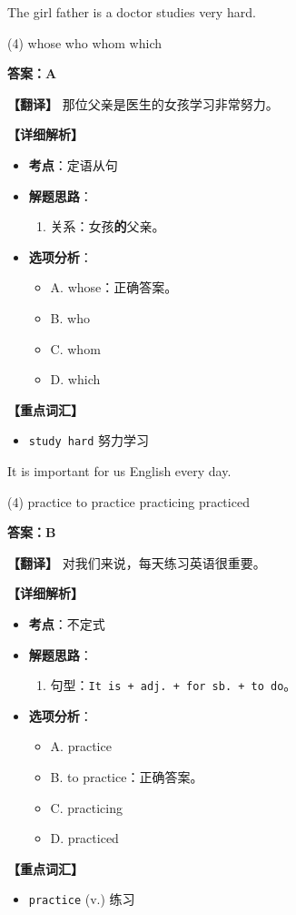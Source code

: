 \documentclass[11pt, a4paper]{article}
\newcommand{\analysis}[4]{
    \begin{solutionbox}
        \textbf{答案：#1}
        
        \textbf{【翻译】} #2
        
        \textbf{【详细解析】}
        #3
        
        \textbf{【重点词汇】}
        #4
    \end{solutionbox}
}
\newcommand{\blank}{\underline{\hspace{1.5cm}}}
\begin{document}
\begin{questions}
    \item The girl \blank father is a doctor studies very hard.
    \begin{tasks}(4)
        \task whose \task who \task whom \task which
    \end{tasks}
    \analysis{A}{那位父亲是医生的女孩学习非常努力。}{
        \begin{itemize}
            \item \textbf{考点}：定语从句
            \item \textbf{解题思路}：
                \begin{enumerate}
                    \item 关系：女孩\textbf{的}父亲。
                \end{enumerate}
            \item \textbf{选项分析}：
                \begin{itemize}
                    \item A. whose：正确答案。
                    \item B. who
                    \item C. whom
                    \item D. which
                \end{itemize}
        \end{itemize}
    }{
        \begin{itemize}
            \item \texttt{study hard} 努力学习
        \end{itemize}
    }

    \item It is important for us \blank English every day.
    \begin{tasks}(4)
        \task practice \task to practice \task practicing \task practiced
    \end{tasks}
    \analysis{B}{对我们来说，每天练习英语很重要。}{
        \begin{itemize}
            \item \textbf{考点}：不定式
            \item \textbf{解题思路}：
                \begin{enumerate}
                    \item 句型：\texttt{It is + adj. + for sb. + to do}。
                \end{enumerate}
            \item \textbf{选项分析}：
                \begin{itemize}
                    \item A. practice
                    \item B. to practice：正确答案。
                    \item C. practicing
                    \item D. practiced
                \end{itemize}
        \end{itemize}
    }{
        \begin{itemize}
            \item \texttt{practice} (v.) 练习
        \end{itemize}
    }


\end{questions}
\end{document}
